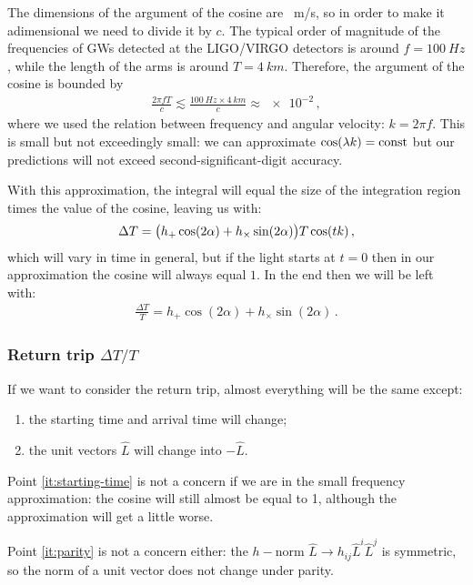 \documentclass[main.tex]{subfiles}
\begin{document}
The dimensions of the argument of the cosine are \SI{}{m/s}, so in order to make it adimensional we need to divide it by \(c\). The typical order of magnitude of the frequencies of GWs detected at the LIGO/VIRGO detectors is around \(f = \SI{100}{Hz}\), while the length of the arms is around \(T =\SI{4}{km}\). Therefore, the argument of the cosine is bounded by 
%
\begin{align}
\frac{2 \pi f T }{c} \lesssim \frac{\SI{100}{Hz} \times \SI{4}{km}}{c} \approx \num{e-2}
\,,
\end{align}
%
where we used the relation between frequency and angular velocity: \(k = 2 \pi f\). This is small but not exceedingly small: we can approximate \(\cos(\lambda k ) = \text{const}\) but our predictions will not exceed second-significant-digit accuracy. 

With this approximation, the integral will equal the size of the integration region times the value of the cosine, leaving us with: 
%
\begin{align}
\Delta T = \qty(h_{+} \cos(2 \alpha ) + h_{ \times } \sin(2 \alpha )) T \cos(t k)
\,,
\end{align}
%
which will vary in time in general, but if the light starts at \(t=0\) then in our approximation the cosine will always equal \(1\).  In the end  then we will be left with: 
%
\begin{align}
\frac{\Delta T}{T} = h_{+} \cos(2 \alpha ) + h_{ \times } \sin(2 \alpha )
\,.
\end{align}

\subsubsection{Return trip \(\Delta T / T\)}

If we want to consider the return trip, almost everything will be the same except: 
\begin{enumerate}
  \item the starting time and arrival time will change;\label{it:starting-time}
  \item the unit vectors \(\hat{L}\) will change into \(- \hat{L}\). \label{it:parity}
\end{enumerate}

Point \ref{it:starting-time} is not a concern if we are in the small frequency approximation: the cosine  will still almost be equal to 1, although the approximation will get a little worse. 

Point \ref{it:parity} is not a concern either: the \(h-\)norm \(\hat{L} \rightarrow h_{ij} \hat{L}^{i} \hat{L}^{j}\) is symmetric, so the norm of a unit vector does not change under parity.
\end{document}
